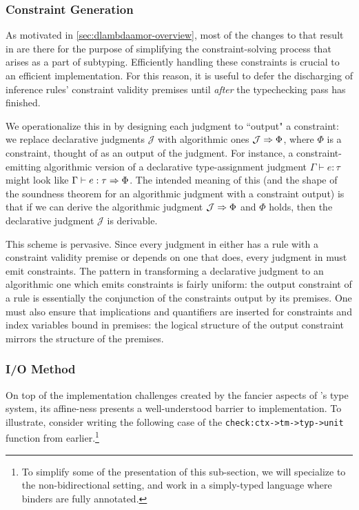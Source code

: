 \subsubsection{Constraint Generation}
As motivated in \autoref{sec:dlambdaamor-overview}, most of the changes to \lambdaamor that result in \dlambdaamor are there for the purpose of simplifying the constraint-solving process that arises as a part of subtyping. Efficiently handling these constraints is crucial to an efficient implementation. For this reason, it is useful to defer the discharging of inference rules' constraint validity premises until \textit{after} the typechecking pass has finished.

We operationalize this in \bilambdaamor by designing each judgment to ``output" a constraint: we replace declarative judgments $\mathcal{J}$ with algorithmic ones $\mathcal{J} \Rightarrow \Phi$, where $\Phi$ is a constraint, thought of as an output of the judgment. For instance, a constraint-emitting algorithmic version of a declarative type-assignment judgment $\Gamma \vdash e : \tau$ might look like $\Gamma \vdash e : \tau \Rightarrow \Phi$. The intended meaning of this (and the shape of the soundness theorem for an algorithmic judgment with a constraint output) is that if we can derive the algorithmic judgment $\mathcal{J} \Rightarrow \Phi$ and $\Phi$ holds, then the declarative judgment $\mathcal{J}$ is derivable.

This scheme is pervasive. Since every judgment in \dlambdaamor either has a rule with a constraint validity premise or depends on one that does, every judgment in \bilambdaamor must emit constraints. The pattern in transforming a declarative judgment to an algorithmic one which emits constraints is fairly uniform: the output constraint of a rule is essentially the conjunction of the constraints output by its premises. One must also ensure that implications and quantifiers are inserted for constraints and index variables bound in premises: the logical structure of the output constraint mirrors the structure of the premises.


\subsubsection{I/O Method}
\label{sec:bilambdaamor-overview-io}
On top of the implementation challenges created by the fancier aspects of \dlambdaamor's type system, its affine-ness presents a well-understood barrier to implementation. To illustrate, consider writing the following case of the \texttt{check:ctx->tm->typ->unit} function from earlier.\footnote{
To simplify some of the presentation of this sub-section, we will specialize to the non-bidirectional setting, and work in a simply-typed language where binders are fully annotated.
}

